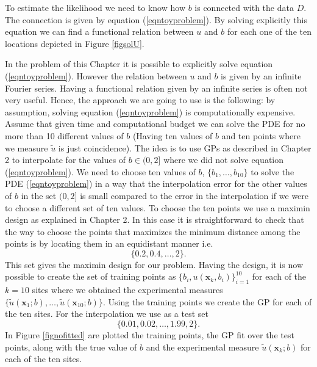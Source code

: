 \documentclass[12pt]{book}
\newcommand{\x}{\textbf{x}}
\begin{document}
To estimate the likelihood we need to know how $b$ is connected with the data $D$. The connection is given by 
equation (\ref{eqntoyproblem}). By solving explicitly this equation we can find a functional relation
between $u$ and $b$ for each one of the ten locations depicted in Figure \ref{figsolU}.

In the problem of this Chapter   it is possible to explicitly solve equation (\ref{eqntoyproblem}). However
the relation between $u$ and $b$ is  given by an infinite Fourier series. Having a functional relation given
by an infinite series is often not very useful. Hence, the  approach we are going to use is the following: 
by assumption,
solving equation (\ref{eqntoyproblem}) is computationally expensive. Assume that given time and computational budget
we can solve the PDE for no more than 10 different values of $b$ (Having ten values of $b$ and ten points
where we measure $\tilde{u}$ is just coincidence). The idea is to use GPs as described
in Chapter 2 to interpolate for the values of $b\in (0,2]$ where we did not  solve equation (\ref{eqntoyproblem}). 
\newline
We need to choose ten values of $b$, $\{b_{1},\dots,b_{10}\}$ to solve the PDE (\ref{eqntoyproblem}) in a way that the interpolation error for 
the other values of $b$ in the set $(0,2]$ is small compared to the error in the interpolation if we were to choose
a different set of ten values. To choose the ten points we use a maximin design as explained in Chapter 2. In this case
it is straightforward to check that the way to choose the points that maximizes the minimum distance among the points
is by locating them in an equidistant manner i.e.
\begin{equation*}
\{0.2,0.4,\ldots,2\}.
\end{equation*}
This set gives the maximin design for our problem.
\newline 
Having the design, it is now possible to  create the set of training points as 
$\{b_{i},u(\x_{k},b_{i})\}_{i=1}^{10}$ for each of the 
$k=10$ sites where we obtained the experimental measures $\{\tilde{u}(\x_{1};b),\ldots,\tilde{u}(\x_{10};b)\}$.
 Using the training
points we create the GP for each of the ten sites. For the interpolation we use as a test set
\begin{equation*}
\{0.01,0.02,\ldots,1.99,2\}.
\end{equation*} 
In Figure \ref{fignofitted} are plotted the training points, 
the GP fit over the test points, along with the true value of $b$
and the experimental measure $\tilde{u}(\x_{k};b)$ for each of the ten sites.
\end{document}
